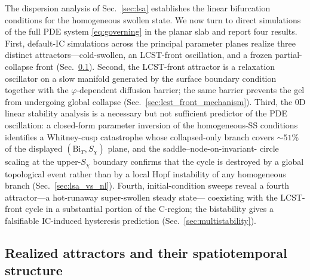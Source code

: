 \documentclass[aps,pre,reprint,superscriptaddress,longbibliography,floatfix]{revtex4-2}
\newcommand{\Bi}{\mathrm{Bi}}
\begin{document}
The dispersion analysis of Sec.~\ref{sec:lsa} establishes the linear
bifurcation conditions for the homogeneous swollen state.  We now
turn to direct simulations of the full PDE system
\eqref{eq:governing} in the planar slab and report four results.
First, default-IC simulations across the principal parameter planes
realize three distinct attractors—cold-swollen, an LCST-front
oscillation, and a frozen partial-collapse front
(Sec.~\ref{sec:phasediagram}).  Second, the LCST-front attractor is
a relaxation oscillator on a slow manifold generated by the surface
boundary condition together with the $\varphi$-dependent diffusion
barrier; the same barrier prevents the gel from undergoing global
collapse (Sec.~\ref{sec:lcst_front_mechanism}).  Third, the 0D
linear stability analysis is a necessary but not sufficient
predictor of the PDE oscillation: a closed-form parameter inversion
of the homogeneous-SS conditions identifies a Whitney-cusp
catastrophe whose collapsed-only branch covers $\sim\!51\%$ of the
displayed $(\Bi_T, S_\chi)$ plane, and the saddle--node-on-invariant-
circle scaling at the upper-$S_\chi$ boundary confirms that the
cycle is destroyed by a global topological event rather than by a
local Hopf instability of any homogeneous branch
(Sec.~\ref{sec:lsa_vs_nl}).  Fourth, initial-condition sweeps reveal
a fourth attractor—a hot-runaway super-swollen steady state—
coexisting with the LCST-front cycle in a substantial portion of
the C-region; the bistability gives a falsifiable IC-induced
hysteresis prediction (Sec.~\ref{sec:multistability}).

\subsection{Realized attractors and their spatiotemporal structure}
\label{sec:phasediagram}
\end{document}
